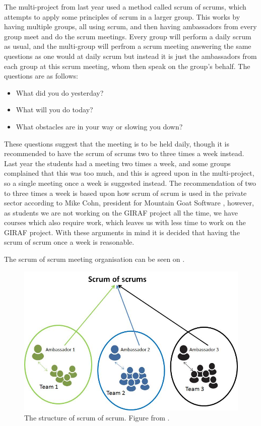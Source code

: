 \bigskip
The multi-project from last year used a method called scrum of scrums, which attempts to apply some principles of scrum in a larger group.
This works by having multiple groups, all using scrum, and then having ambassadors from every group meet and do the scrum meetings. 
Every group will perform a daily scrum as usual, and the multi-group will perfrom a scrum meeting answering the same questions as one would at daily scrum but instead it is just the ambassadors from each group at this scrum meeting, whom then speak on the group's behalf.
The questions are as follows:

\begin{itemize}
	\item What did you do yesterday? 
	\item What will you do today?
	\item What obstacles are in your way or slowing you down?
\end{itemize}

These questions suggest that the meeting is to be held daily, though it is recommended to have the scrum of scrums two to three times a week instead. 
Last year the students had a meeting two times a week, and some groups complained that this was too much, and this is agreed upon in the multi-project, so a single meeting once a week is suggested instead.
The recommendation of two to three times a week is based upon how scrum of scrum is used in the private sector according to Mike Cohn, president for Mountain Goat Software \citep{SCRUMoSCRUM}, however, as students we are not working on the GIRAF project all the time, we have courses which also require work, which leaves us with less time to work on the GIRAF project. 
With these arguments in mind it is decided that having the scrum of scrum once a week is reasonable.

The scrum of scrum meeting organisation can be seen on .

\begin{figure}
\centering
\includegraphics[scale=0.4]{figures/scrumofscrum.png}
\caption{The structure of scrum of scrum. Figure from \cite{scrumofscrumfigure}.}
\label{fig:scrumofscrum}
\end{figure}

